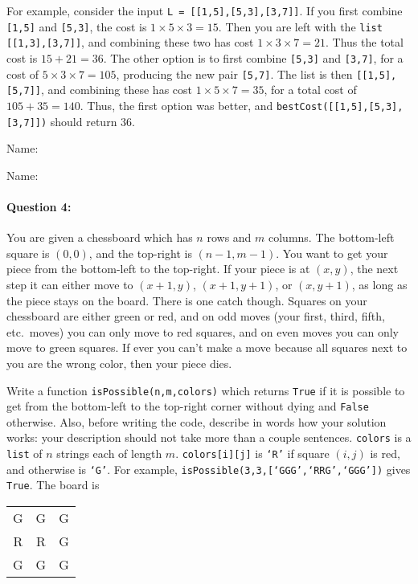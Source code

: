 \documentclass[11pt]{article}
\begin{document}
For example, consider the input \texttt{L = [[1,5],[5,3],[3,7]]}. If
you first combine \texttt{[1,5]} and \texttt{[5,3]}, the cost is
$1\times 5\times 3 = 15$.  Then you are left with the \texttt{list}
\texttt{[[1,3],[3,7]]}, and combining these two has cost $1\times
3\times 7 = 21$.  Thus the total cost is $15 + 21 = 36$.  The other
option is to first combine \texttt{[5,3]} and \texttt{[3,7]}, for a
cost of $5\times 3\times 7 = 105$, producing the new pair
\texttt{[5,7]}.  The list is then \texttt{[[1,5],[5,7]]}, and
combining these has cost $1\times 5\times 7 = 35$, for a total cost of
$105 + 35 = 140$.  Thus, the first option was better, and
\texttt{bestCost([[1,5],[5,3],[3,7]])} should return $36$.

\newpage
\noindent Name:
\newpage

\noindent Name:

\paragraph{Question 4:}
You are given a chessboard which has $n$ rows and $m$ columns.  The
bottom-left square is $(0,0)$, and the top-right is $(n-1,m-1)$.  
You want to get your piece from the bottom-left to
the top-right.  If your piece is at $(x,y)$, the next step it can
either move to $(x+1,y)$, $(x+1,y+1)$, or $(x,y+1)$, as long as the
piece stays on the board.
There is one catch though.  Squares on your chessboard
are either green or red, and on odd moves (your first, third, fifth,
etc.\ moves) you can only move to red
squares, and on even moves you can only move to green squares.  If
ever you can't make a move because all squares
next to you are the wrong color, then your piece dies.

Write a function \texttt{isPossible(n,m,colors)} which returns
\texttt{True} if it is possible to get from the
bottom-left to the top-right corner without dying and \texttt{False}
otherwise.
Also, before writing the code, describe in words how your solution
works: your description should not take more than  a couple sentences.
\texttt{colors} is a
\texttt{list} of $n$ strings each of length $m$.
\texttt{colors[i][j]} is \texttt{`R'} if square $(i,j)$ is red, and
otherwise is \texttt{`G'}.  For example,
\texttt{isPossible(3,3,[`GGG',`RRG',`GGG'])} gives \texttt{True}. The
board is
\begin{center}
\begin{tabular}{ccc}
G&G&G\\
R&R&G\\
G&G&G
\end{tabular}
\end{center}
\end{document}
